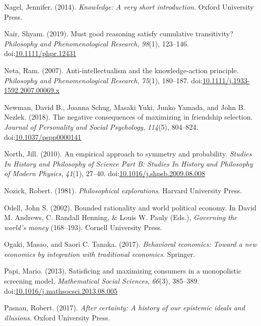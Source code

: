 \documentclass[
  10pt,
  letterpaper,
  twoside]{scrbook}
\newlength{\cslhangindent}
\newenvironment{CSLReferences}[2] %
 {\begin{list}{}{%
  \setlength{\itemindent}{0pt}
  \setlength{\leftmargin}{0pt}
  \setlength{\parsep}{0pt}
  \ifodd #1
   \setlength{\leftmargin}{\cslhangindent}
   \setlength{\itemindent}{-1\cslhangindent}
  \fi
  \setlength{\itemsep}{#2\baselineskip}}}
 {\end{list}}
\begin{document}
\begin{CSLReferences}{1}{0}
Nagel, Jennifer. (2014). \emph{Knowledge: A very short introduction}.
Oxford University Press.

Nair, Shyam. (2019). Must good reasoning satisfy cumulative
transitivity? \emph{Philosophy and Phenomenological Research},
\emph{98}(1), 123--146.
doi:\href{https://doi.org/10.1111/phpr.12431}{10.1111/phpr.12431}

Neta, Ram. (2007). Anti-intellectualism and the knowledge-action
principle. \emph{Philosophy and Phenomenological Research},
\emph{75}(1), 180--187.
doi:\href{https://doi.org/10.1111/j.1933-1592.2007.00069.x}{10.1111/j.1933-1592.2007.00069.x}

Newman, David B., Joanna Schug, Masaki Yuki, Junko Yamada, and John B.
Nezlek. (2018). The negative consequences of maximizing in friendship
selection. \emph{Journal of Personality and Social Psychology},
\emph{114}(5), 804--824.
doi:\href{https://doi.org/10.1037/pspp0000141}{10.1037/pspp0000141}

North, Jill. (2010). An empirical approach to symmetry and probability.
\emph{Studies In History and Philosophy of Science Part B: Studies In
History and Philosophy of Modern Physics}, \emph{41}(1), 27--40.
doi:\href{https://doi.org/10.1016/j.shpsb.2009.08.008}{10.1016/j.shpsb.2009.08.008}

Nozick, Robert. (1981). \emph{Philosophical explorations}. Harvard
University Press.

Odell, John S. (2002). Bounded rationality and world political economy.
In David M. Andrews, C. Randall Henning, \& Louis W. Pauly (Eds.),
\emph{Governing the world's money} (168--193). Cornell University Press.

Ogaki, Masao, and Saori C. Tanaka. (2017). \emph{Behavioral economics:
Toward a new economics by integration with traditional economics}.
Springer.

Papi, Mario. (2013). Satisficing and maximizing consumers in a
monopolistic screening model. \emph{Mathematical Social Sciences},
\emph{66}(3), 385--389.
doi:\href{https://doi.org/10.1016/j.mathsocsci.2013.08.005}{10.1016/j.mathsocsci.2013.08.005}

Pasnau, Robert. (2017). \emph{After certainty: A history of our
epistemic ideals and illusions}. Oxford University Press.


\end{CSLReferences}
\end{document}
